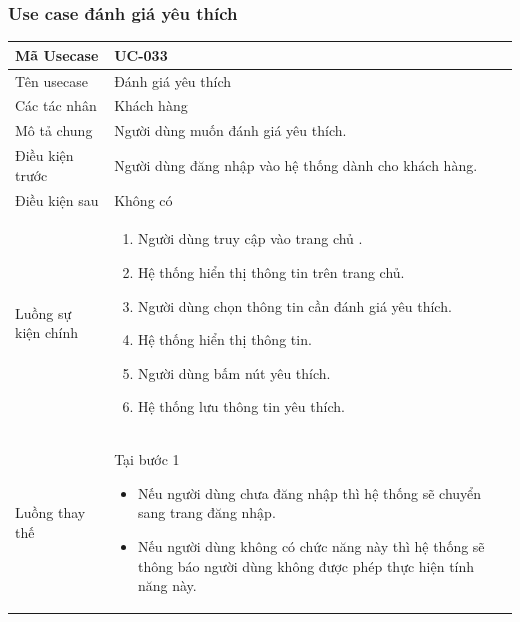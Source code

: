 \documentclass[12pt,a4paper]{article}
\begin{document}

    \subsubsection*{Use case đánh giá yêu thích}
    \begin{table}[H]
        \centering
        \begin{tabular}{|p{3.5cm}|p{11.5cm}|c|}
            \hline
            Mã Usecase      & UC-033                                                 \\
            \hline
            Tên usecase     & Đánh giá yêu thích                                     \\
            \hline
            Các tác nhân    & Khách hàng                                             \\
            \hline
            Mô tả chung     & Người dùng muốn đánh giá yêu thích.                    \\
            \hline
            Điều kiện trước & Người dùng đăng nhập vào hệ thống dành cho khách hàng. \\
            \hline
            Điều kiện sau   & Không có                                               \\
            \hline
            Luồng sự kiện chính & \vspace{-.8cm}\begin{enumerate}
                                                    \item Người dùng truy cập vào trang chủ .
                                                    \item Hệ thống hiển thị thông tin trên trang chủ.
                                                    \item Người dùng chọn thông tin cần đánh giá yêu thích.
                                                    \item Hệ thống hiển thị thông tin.
                                                    \item Người dùng bấm nút yêu thích.
                                                    \item Hệ thống lưu thông tin yêu thích.
            \end{enumerate}
            \\
            \hline
            Luồng thay thế & Tại bước 1\newline
            \vspace{-.8cm}\begin{itemize}
                              \item Nếu người dùng chưa đăng nhập thì hệ thống sẽ chuyển sang trang đăng nhập.
                              \item Nếu người dùng không có chức năng này thì hệ thống sẽ thông báo người dùng không được phép thực hiện tính năng này.
            \end{itemize}


\end{tabular}
\end{table}
\end{document}
